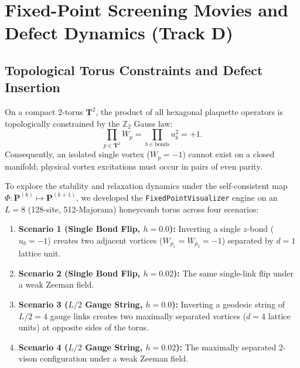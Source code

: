 \chapter{Fixed-Point Screening Movies and Defect Dynamics (Track D)}
\label{ch:phase4_screening_movies}

\section{Topological Torus Constraints and Defect Insertion}
\label{sec:phase4_defects}

On a compact 2-torus $\mathbf{T}^2$, the product of all hexagonal plaquette operators is topologically constrained by the $\mathbb{Z}_2$ Gauss law:
\begin{equation}
\prod_{p \in \mathbf{T}^2} W_p = \prod_{b \in \text{bonds}} u_b^2 = +1.
\end{equation}
Consequently, an isolated single vortex ($W_p = -1$) cannot exist on a closed manifold; physical vortex excitations must occur in pairs of even parity.

To explore the stability and relaxation dynamics under the self-consistent map $\Phi: \mathbf{P}^{(k)} \mapsto \mathbf{P}^{(k+1)}$, we developed the \texttt{FixedPointVisualizer} engine on an $L = 8$ (128-site, 512-Majorana) honeycomb torus across four scenarios:
\begin{enumerate}
    \item \textbf{Scenario 1 (Single Bond Flip, $h = 0.0$):} Inverting a single $z$-bond ($u_b = -1$) creates two adjacent vortices ($W_{p_1} = W_{p_2} = -1$) separated by $d = 1$ lattice unit.
    \item \textbf{Scenario 2 (Single Bond Flip, $h = 0.02$):} The same single-link flip under a weak Zeeman field.
    \item \textbf{Scenario 3 ($L/2$ Gauge String, $h = 0.0$):} Inverting a geodesic string of $L/2 = 4$ gauge links creates two maximally separated vortices ($d = 4$ lattice units) at opposite sides of the torus.
    \item \textbf{Scenario 4 ($L/2$ Gauge String, $h = 0.02$):} The maximally separated 2-vison configuration under a weak Zeeman field.
\end{enumerate}

